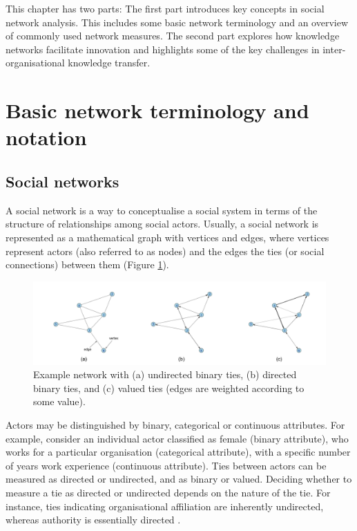 This chapter has two parts: The first part introduces key concepts in social network analysis. This includes some basic network terminology and an overview of commonly used network measures. The second part explores how knowledge networks facilitate innovation and highlights some of the key challenges in inter\hyp{}organisational knowledge transfer. \medskip

\section{Basic network terminology and notation}

\subsection{Social networks}

A social network is a way to conceptualise a social system in terms of the structure of relationships among social actors. Usually, a social network is represented as a mathematical graph with vertices and edges, where vertices represent actors (also referred to as nodes) and the edges the ties (or social connections) between them (Figure \ref{fig:examples}). \medskip

\begin{figure}
	\centering
	\includegraphics[width=1.0\linewidth]{Images/example_networks.png}
	\caption{Example network with (a) undirected binary ties, (b) directed binary ties, and (c) valued ties (edges are weighted according to some value).}
	\label{fig:examples}
\end{figure}

 Actors may be distinguished by binary, categorical or continuous attributes. For example, consider an individual actor classified as female (binary attribute), who works for a particular organisation (categorical attribute), with a specific number of years work experience (continuous attribute). Ties between actors can be measured as directed or undirected, and as binary or valued. Deciding whether to measure a tie as directed or undirected depends on the nature of the tie. For instance, ties indicating organisational affiliation are inherently undirected, whereas authority is essentially directed \citep{borgatti2013analyzing}. \medskip
 
